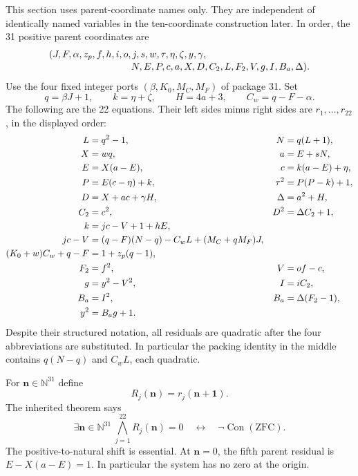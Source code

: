 \documentclass[11pt,letterpaper]{article}
\theoremstyle{definition}\newtheorem{definition}[theorem]{Definition}
\theoremstyle{remark}\newtheorem{remark}[theorem]{Remark}
\newcommand{\N}{\mathbb N}
\newcommand{\Con}{\operatorname{Con}}
\begin{document}
This section uses parent-coordinate names only. They are independent of identically named variables in the ten-coordinate construction later. In order, the 31 positive parent coordinates are
\begin{align*}
 &(J,F,\alpha,z_p,f,h,i,o,j,s,w,\tau,\eta,\zeta,y,\gamma,\\*[-2pt]
 &\hspace{30mm}N,E,P,c,a,X,D,C_2,L,F_2,V,g,I,B_a,\Delta).
\end{align*}
Use the four fixed integer ports $(\beta,K_0,M_C,M_F)$ of package 31. Set
\[
 q=\beta J+1,\qquad k=\eta+\zeta,\qquad H=4a+3,\qquad C_w=q-F-\alpha.
\]
The following are the 22 equations. Their left sides minus right sides are $r_1,\ldots,r_{22}$, in the displayed order:
\begin{align}
 L&=q^2-1,& N&=q(L+1),\notag\\
 X&=wq,& a&=E+sN,\notag\\
 E&=X(a-E),& c&=k(a-E)+\eta,\notag\\
 P&=E(c-\eta)+k,&\tau^2&=P(P-k)+1,\notag\\
 D&=X+ac+\gamma H,&\Delta&=a^2+H,\notag\\
 C_2&=c^2,&D^2&=\Delta C_2+1,\notag\\
 k&=jc-V+1+hE,\notag\\
 jc-V&=(q-F)(N-q)-C_wL+(M_C+qM_F)J,\notag\\
 (K_0+w)C_w+q-F&=1+z_p(q-1),\notag\\
 F_2&=f^2,&V&=of-c,\notag\\
 g&=y^2-V^2,&I&=iC_2,\notag\\
 B_a&=I^2,&B_a&=\Delta(F_2-1),\notag\\
 y^2&=B_ag+1.\label{eq:parent}
\end{align}
Despite their structured notation, all residuals are quadratic after the four abbreviations are substituted. In particular the packing identity in the middle contains $q(N-q)$ and $C_wL$, each quadratic.

For $\mathbf n\in\N^{31}$ define
\[
 R_j(\mathbf n)=r_j(\mathbf n+\mathbf1).
\]
The inherited theorem says
\begin{equation}\label{eq:parentcontract}
 \exists\mathbf n\in\N^{31}\ \bigwedge_{j=1}^{22}R_j(\mathbf n)=0
 \quad\longleftrightarrow\quad\neg\Con(\mathrm{ZFC}).
\end{equation}
The positive-to-natural shift is essential. At $\mathbf n=0$, the fifth parent residual is $E-X(a-E)=1$. In particular the system has no zero at the origin.
\end{document}
